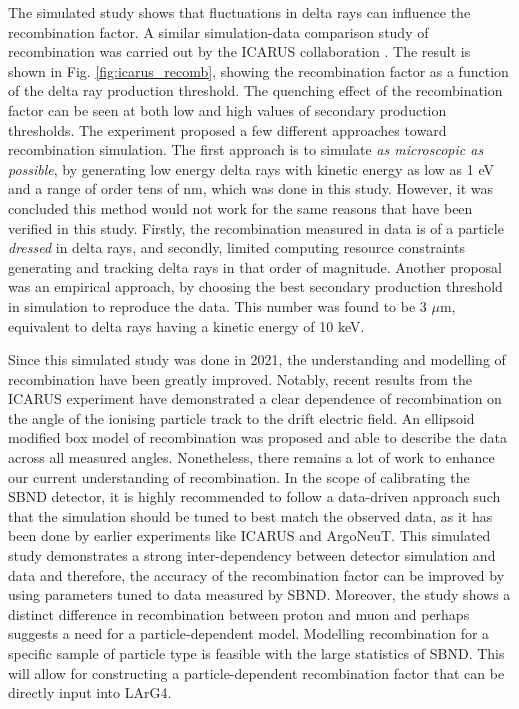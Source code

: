 The simulated study shows that fluctuations in delta rays can influence the recombination factor.
A similar simulation-data comparison study of recombination was carried out by the ICARUS collaboration \cite{icarus_recomb}.
The result is shown in Fig. \ref{fig:icarus_recomb}, showing the recombination factor as a function of the delta ray production threshold. 
The quenching effect of the recombination factor can be seen at both low and high values of secondary production thresholds.
The experiment proposed a few different approaches toward recombination simulation.
The first approach is to simulate \textit{as microscopic as possible}, by generating low energy delta rays with kinetic energy as low as 1 eV and a range of order tens of nm, which was done in this study.
However, it was concluded this method would not work for the same reasons that have been verified in this study.
Firstly, the recombination measured in data is of a particle \textit{dressed} in delta rays, and secondly, limited computing resource constraints generating and tracking delta rays in that order of magnitude.
Another proposal was an empirical approach, by choosing the best secondary production threshold in simulation to reproduce the data.
This number was found to be 3 $\mu$m, equivalent to delta rays having a kinetic energy of 10 keV.


Since this simulated study was done in 2021, the understanding and modelling of recombination have been greatly improved.
Notably, recent results from the ICARUS experiment \cite{} have demonstrated a clear dependence of recombination on the angle of the ionising particle track to the drift electric field. 
An ellipsoid modified box model of recombination was proposed and able to describe the data across all measured angles. 
Nonetheless, there remains a lot of work to enhance our current understanding of recombination.
In the scope of calibrating the SBND detector, it is highly recommended to follow a data-driven approach such that the simulation should be tuned to best match the observed data, as it has been done by earlier experiments like ICARUS and ArgoNeuT.
This simulated study demonstrates a strong inter-dependency between detector simulation and data and therefore, the accuracy of the recombination factor can be improved by using parameters tuned to data measured by SBND.
Moreover, the study shows a distinct difference in recombination between proton and muon and perhaps suggests a need for a particle-dependent model.
Modelling recombination for a specific sample of particle type is feasible with the large statistics of SBND. 
This will allow for constructing a particle-dependent recombination factor that can be directly input into LArG4.
